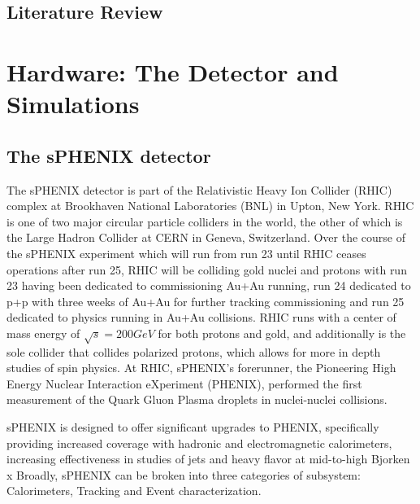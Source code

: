 \documentclass[letterpaper, 12pt, oneside]{book}
\theoremstyle{definition}
\begin{document}
\frontmatter

\setcounter{page}{2}





\tableofcontents
\listoftables
\listoffigures

\mainmatter
\chapter{Literature Review}
\label{ch:LR}
 
\part{Hardware: The Detector and Simulations}
\chapter{The sPHENIX detector}
The sPHENIX detector is part of the Relativistic Heavy Ion Collider (RHIC) complex at Brookhaven National Laboratories (BNL) in Upton, New York. 
RHIC is one of two major circular particle colliders in the world, the other of which is the Large Hadron Collider at CERN in Geneva, Switzerland. 
Over the course of the sPHENIX experiment which will run from run 23 until RHIC ceases operations after run 25, RHIC will be colliding gold nuclei and protons with run 23 having been dedicated to commissioning Au+Au running, 
run 24 dedicated to p+p with three weeks of Au+Au for further tracking commissioning and run 25 dedicated to physics running in Au+Au collisions. 
RHIC runs with a center of mass energy of $\sqrt{s} = 200 GeV$ for both protons and gold, and additionally is the sole collider that collides polarized protons, which allows for more in depth studies of spin physics. 
At RHIC, sPHENIX's forerunner, the Pioneering High Energy Nuclear Interaction eXperiment (PHENIX), performed the first measurement of the Quark Gluon Plasma droplets \cite{QGP_droplets} in nuclei-nuclei collisions. 

sPHENIX is designed to offer significant upgrades to PHENIX, specifically providing increased coverage with hadronic and electromagnetic calorimeters, increasing effectiveness in studies of jets and heavy flavor at mid-to-high Bjorken x \cite{sPHENIX_TDR}\cite{sPHENIX_whitepaper}\cite{sPHENIX_physics_goals}
Broadly, sPHENIX can be broken into three categories of subsystem: Calorimeters, Tracking and Event characterization.
\end{document}
